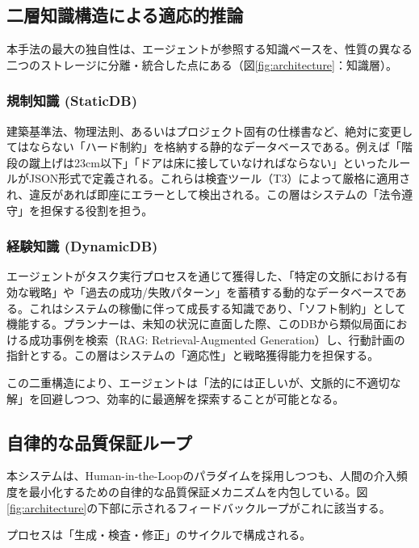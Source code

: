 \documentclass[dvipdfmx, a4paper, 9pt]{deimj}
\begin{document}
\subsection{二層知識構造による適応的推論}

本手法の最大の独自性は、エージェントが参照する知識ベースを、性質の異なる二つのストレージに分離・統合した点にある（図\ref{fig:architecture}：知識層）。

\subsubsection{規制知識 (StaticDB)}

建築基準法、物理法則、あるいはプロジェクト固有の仕様書など、絶対に変更してはならない「ハード制約」を格納する静的なデータベースである。例えば「階段の蹴上げは23cm以下」「ドアは床に接していなければならない」といったルールがJSON形式で定義される。これらは検査ツール（T3）によって厳格に適用され、違反があれば即座にエラーとして検出される。この層はシステムの「法令遵守」を担保する役割を担う。

\subsubsection{経験知識 (DynamicDB)}

エージェントがタスク実行プロセスを通じて獲得した、「特定の文脈における有効な戦略」や「過去の成功/失敗パターン」を蓄積する動的なデータベースである\cite{wang2023voyager}。これはシステムの稼働に伴って成長する知識であり、「ソフト制約」として機能する。プランナーは、未知の状況に直面した際、このDBから類似局面における成功事例を検索（RAG: Retrieval-Augmented Generation\cite{lewis2020rag}）し、行動計画の指針とする。この層はシステムの「適応性」と戦略獲得能力を担保する。

この二重構造により、エージェントは「法的には正しいが、文脈的に不適切な解」を回避しつつ、効率的に最適解を探索することが可能となる。

\subsection{自律的な品質保証ループ}

本システムは、Human-in-the-Loopのパラダイムを採用しつつも、人間の介入頻度を最小化するための自律的な品質保証メカニズムを内包している。図\ref{fig:architecture}の下部に示されるフィードバックループがこれに該当する。

プロセスは「生成・検査・修正」のサイクルで構成される。
\end{document}
